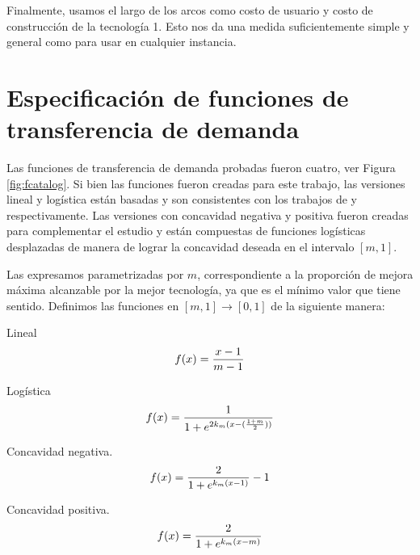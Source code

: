 Finalmente, usamos el largo de los arcos como costo de usuario y costo de construcción de la tecnología 1. Esto nos da una medida suficientemente simple y general como para usar en cualquier instancia.

\section{Especificación de funciones de transferencia de demanda}
\label{sect:fspecification}

Las funciones de transferencia de demanda probadas fueron cuatro, ver Figura \ref{fig:fcatalog}. Si bien las funciones fueron creadas para este trabajo, las versiones lineal y logística están basadas y son consistentes con los trabajos de \cite{shwe2014} y \cite{ortuz2011} respectivamente. Las versiones con concavidad negativa y positiva fueron creadas para complementar el estudio y están compuestas de funciones logísticas desplazadas de manera de lograr la concavidad deseada en el intervalo $[m, 1]$.

Las expresamos parametrizadas por $m$, correspondiente a la proporción de mejora máxima alcanzable por la mejor tecnología, ya que es el mínimo valor que tiene sentido. Definimos las funciones en $[m, 1] \rightarrow [0, 1]$ de la siguiente manera:

\begin{definition}
  Lineal
  \begin{align}
      f(x) = {x -1 \over m - 1}
  \end{align}
\end{definition}

\begin{definition}
  Logística
  \begin{align}
      f(x) = {1 \over 1 + e^{2k_m(x - ({1 + m \over 2}))}}
  \end{align}
\end{definition}

\begin{definition}
  Concavidad negativa.
  \begin{align}
      f(x) = {2 \over 1 + e^{k_m(x - 1)}} - 1
  \end{align}
\end{definition}

\begin{definition}
  Concavidad positiva.
  \begin{align}
      f(x) = {2 \over 1 + e^{k_m(x - m)}}
  \end{align}
\end{definition}

